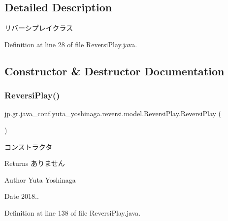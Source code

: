 \subsection{Detailed Description}
リバーシプレイクラス 

Definition at line 28 of file Reversi\+Play.\+java.



\subsection{Constructor \& Destructor Documentation}
\mbox{\label{classjp_1_1gr_1_1java__conf_1_1yuta__yoshinaga_1_1reversi_1_1model_1_1_reversi_play_a8244dde6e8abc75432834de7ccb4f52c}} 
\subsubsection{\texorpdfstring{Reversi\+Play()}{ReversiPlay()}}
{\footnotesize\ttfamily jp.\+gr.\+java\+\_\+conf.\+yuta\+\_\+yoshinaga.\+reversi.\+model.\+Reversi\+Play.\+Reversi\+Play (\begin{DoxyParamCaption}{ }\end{DoxyParamCaption})}



コンストラクタ 

\begin{DoxyReturn}{Returns}
ありません 
\end{DoxyReturn}
\begin{DoxyAuthor}{Author}
Yuta Yoshinaga 
\end{DoxyAuthor}
\begin{DoxyDate}{Date}
2018.. 
\end{DoxyDate}


Definition at line 138 of file Reversi\+Play.\+java.



